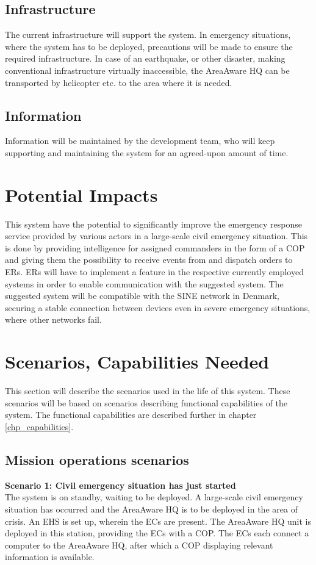 \subsection{Infrastructure}
The current infrastructure will support the system. In emergency situations, where the system has to be deployed, precautions will be made to ensure the required infrastructure.
In case of an earthquake, or other disaster, making conventional infrastructure virtually inaccessible, the AreaAware HQ can be transported by helicopter etc. to the area where it is needed.

\subsection{Information}
Information will be maintained by the development team, who will keep supporting and maintaining the system for an agreed-upon amount of time.


\section{Potential Impacts}
This system have the potential to significantly improve the emergency response service provided by various actors in a large-scale civil emergency situation. This is done by providing intelligence for assigned commanders in the form of a COP and giving them the possibility to receive events from and dispatch orders to ERs. ERs will have to implement a feature in the respective currently employed systems in order to enable communication with the suggested system. 
The suggested system will be compatible with the SINE network in Denmark, securing a stable connection between devices even in severe emergency situations, where other networks fail.


\newpage
\section{Scenarios, Capabilities Needed}
\label{sec_scenarios}
This section will describe the scenarios used	in the life of this system. These scenarios will be based on scenarios describing functional capabilities of the system. The functional capabilities are described further in chapter \ref{chp_capabilities}.

\subsection{Mission operations scenarios}
\noindent \textbf{Scenario 1: Civil emergency situation has just started} \\
The system is on standby, waiting to be deployed. 
A large-scale civil emergency situation has occurred and the AreaAware HQ is to be deployed in the area of crisis. An EHS is set up, wherein the ECs are present. The AreaAware HQ unit is deployed in this station, providing the ECs with a COP. The ECs each connect a computer to the AreaAware HQ, after which a COP displaying relevant information is available.

